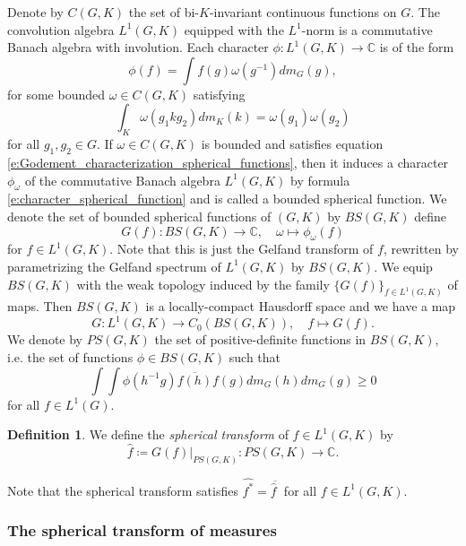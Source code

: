 \documentclass[12pt,reqno,a4paper]{amsart}
\theoremstyle{theorem}
\theoremstyle{definition}
\newtheorem{definition}[theorem]{Definition}
\numberwithin{theorem}{section}
\numberwithin{equation}{section}
\newcommand{\C}{\mathbb{C}}
\begin{document}
Denote by $C(G, K)$ the set of bi-$K$-invariant continuous functions on $G$. 
The convolution algebra $L^1(G, K)$ equipped with the $L^1$-norm is a commutative Banach algebra with involution. 
Each character $\phi:L^1(G, K)\to \C$ is of the form
\begin{equation}\label{e:character_spherical_function}
\phi(f)= \int f(g)\omega(g^{-1})dm_G(g),
\end{equation}
for some bounded $\omega\in C(G, K)$ satisfying
\begin{equation}\label{e:Godement_characterization_spherical_functions}
	\int_K \omega(g_1kg_2)dm_K(k) = \omega(g_1)\omega(g_2)
\end{equation}
for all $g_1,g_2\in G$.
If $\omega\in C(G, K)$ is bounded and satisfies equation \eqref{e:Godement_characterization_spherical_functions}, then it induces a character $\phi_\omega$ of the commutative Banach algebra $L^1(G, K)$ by formula \eqref{e:character_spherical_function} and is called a bounded spherical function.
We denote the set of bounded spherical functions of $(G, K)$ by $BS(G, K)$ define
\begin{equation*}\label{e:gelfand_transform_of_function}
G(f):BS(G, K)\to \C,\quad \omega \mapsto \phi_\omega(f)
\end{equation*}
for $f\in L^1(G, K)$.
Note that this is just the Gelfand transform of $f$, rewritten by parametrizing the Gelfand spectrum of $L^1(G, K)$ by $BS(G, K)$.
We equip $BS(G, K)$ with the weak topology induced by the family $\{G(f)\}_{f\in L^1(G, K)}$ of maps.
Then $BS(G,K)$ is a locally-compact Hausdorff space
and we have a map
\[
G:L^1(G,K)\to C_0(BS(G, K)), \quad f\mapsto G(f).
\]
We denote by $PS(G, K)$ the set of positive-definite functions in $BS(G, K)$, i.e. the set of functions $\phi\in BS(G, K)$
such that
\[\int\int \phi(h^{-1}g)\overline{f(h)}f(g)dm_G(h)dm_G(g)\geq 0\]
for all $f\in L^1(G)$.
\begin{definition}
	We define the \emph{spherical transform} of $f\in L^1(G, K)$ by  
	\[
	\widehat{f}\coloneqq G(f)|_{PS(G, K)}:PS(G,K)\to \C.
	\]
\end{definition}

Note that the spherical transform satisfies $\widehat{f^*} = \overline{\widehat{f}\hspace{3pt}}$ for all $f\in L^1(G, K)$.
\subsubsection{The spherical transform of measures}
\end{document}
